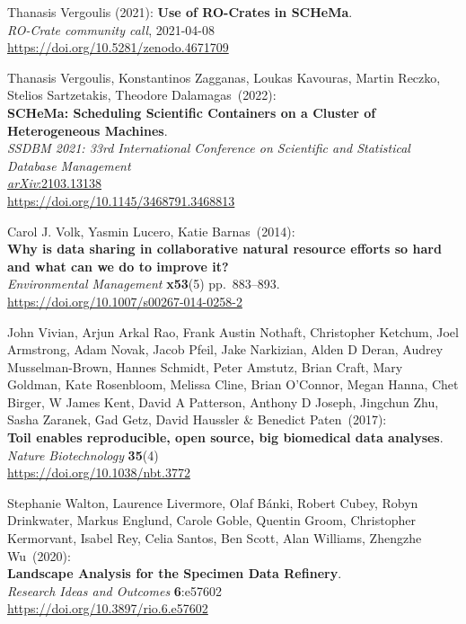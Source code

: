 \begin{thebibliography}{9}
Thanasis Vergoulis (2021):  
\textbf{Use of RO-Crates in SCHeMa}.\\
\emph{RO-Crate community call}, 2021-04-08\\
\url{https://doi.org/10.5281/zenodo.4671709}


Thanasis Vergoulis, Konstantinos Zagganas, Loukas Kavouras, Martin Reczko, Stelios Sartzetakis, Theodore Dalamagas~(2022):\\
\textbf{SCHeMa: Scheduling Scientific Containers on a Cluster of
Heterogeneous Machines}.\\
\emph{SSDBM 2021: 33rd International Conference on Scientific and Statistical Database Management}\\
\href{https://doi.org/10.48550/arXiv.2103.13138}{\emph{arXiv}:2103.13138}\\
\url{https://doi.org/10.1145/3468791.3468813}

Carol J. Volk, Yasmin Lucero, Katie Barnas~(2014):\\
\textbf{Why is data sharing in collaborative natural resource efforts so
hard and what can we do to improve it?}\\
\emph{Environmental Management} \textbf{x53}(5) pp.~883--893.\\
\url{https://doi.org/10.1007/s00267-014-0258-2}

John Vivian, Arjun Arkal Rao, Frank Austin Nothaft, Christopher
Ketchum, Joel Armstrong, Adam Novak, Jacob Pfeil, Jake Narkizian, Alden
D Deran, Audrey Musselman-Brown, Hannes Schmidt, Peter Amstutz, Brian
Craft, Mary Goldman, Kate Rosenbloom, Melissa Cline, Brian O'Connor,
Megan Hanna, Chet Birger, W James Kent, David A Patterson, Anthony D
Joseph, Jingchun Zhu, Sasha Zaranek, Gad Getz, David Haussler \&
Benedict Paten~(2017):\\
\textbf{Toil enables reproducible, open source, big biomedical data
analyses}.\\
\emph{Nature Biotechnology} \textbf{35}(4)\\
\url{https://doi.org/10.1038/nbt.3772}

Stephanie Walton, Laurence Livermore, Olaf Bánki,
Robert Cubey, Robyn Drinkwater, Markus Englund, Carole Goble, Quentin
Groom, Christopher Kermorvant, Isabel Rey, Celia Santos, Ben Scott, Alan
Williams, Zhengzhe Wu~(2020):\\
\textbf{Landscape Analysis for the Specimen Data Refinery}.\\
\emph{Research Ideas and Outcomes} \textbf{6}:e57602\\
\url{https://doi.org/10.3897/rio.6.e57602}


\end{thebibliography}
